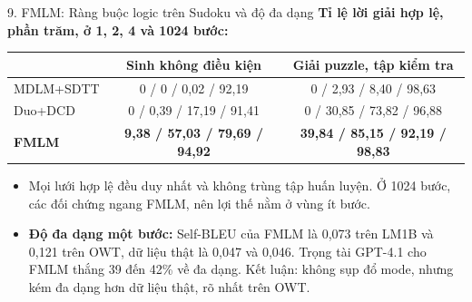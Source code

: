 \begin{frame}{9. FMLM: Ràng buộc logic trên Sudoku và độ đa dạng}
    \textbf{Tỉ lệ lời giải hợp lệ, phần trăm, ở 1, 2, 4 và 1024 bước:}
    \begin{table}[h]
        \centering
        \footnotesize
        \begin{tabular}{lcc}
            \toprule
            & \textbf{Sinh không điều kiện} & \textbf{Giải puzzle, tập kiểm tra} \\
            \midrule
            MDLM+SDTT & 0 / 0 / 0,02 / 92,19 & 0 / 2,93 / 8,40 / 98,63 \\
            Duo+DCD & 0 / 0,39 / 17,19 / 91,41 & 0 / 30,85 / 73,82 / 96,88 \\
            \textbf{FMLM} & \textbf{9,38 / 57,03 / 79,69 / 94,92} & \textbf{39,84 / 85,15 / 92,19 / 98,83} \\
            \bottomrule
        \end{tabular}
    \end{table}
    \vspace{-0.2cm}
    \begin{itemize}
        \item Mọi lưới hợp lệ đều duy nhất và không trùng tập huấn luyện. Ở 1024 bước, các đối chứng ngang FMLM, nên lợi thế nằm ở vùng ít bước.
        \item \textbf{Độ đa dạng một bước:} Self-BLEU của FMLM là 0,073 trên LM1B và 0,121 trên OWT, dữ liệu thật là 0,047 và 0,046. Trọng tài GPT-4.1 cho FMLM thắng 39 đến 42\% về đa dạng. Kết luận: không sụp đổ mode, nhưng kém đa dạng hơn dữ liệu thật, rõ nhất trên OWT.
    \end{itemize}
\end{frame}

